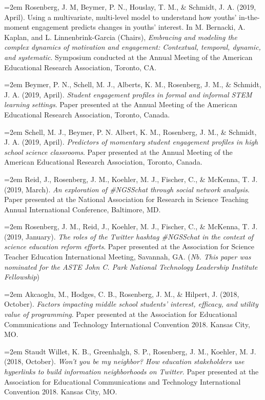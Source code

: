 \documentclass[
  14,
]{article}
\begin{document}
\hangindent=2em Rosenberg, J. M, Beymer, P. N., Houslay, T. M., \&
Schmidt, J. A. (2019, April). Using a multivariate, multi-level model to
understand how youths' in-the-moment engagement predicts changes in
youths' interest. In M. Bernacki, A. Kaplan, and L. Linnenbrink-Garcia
(Chairs), \emph{Embracing and modeling the complex dynamics of
motivation and engagement: Contextual, temporal, dynamic, and
systematic}. Symposium conducted at the Annual Meeting of the American
Educational Research Association, Toronto, CA.

\hangindent=2em Beymer, P. N., Schell, M. J., Alberts, K. M., Rosenberg,
J. M., \& Schmidt, J. A. (2019, April). \emph{Student engagement
profiles in formal and informal STEM learning settings}. Paper presented
at the Annual Meeting of the American Educational Research Association,
Toronto, Canada.

\hangindent=2em Schell, M. J., Beymer, P. N. Albert, K. M., Rosenberg,
J. M., \& Schmidt, J. A. (2019, April). \emph{Predictors of momentary
student engagement profiles in high school science classrooms}. Paper
presented at the Annual Meeting of the American Educational Research
Association, Toronto, Canada.

\hangindent=2em Reid, J., Rosenberg, J. M., Koehler, M. J., Fischer, C.,
\& McKenna, T. J. (2019, March). \emph{An exploration of \#NGSSchat
through social network analysis}. Paper presented at the National
Association for Research in Science Teaching Annual International
Conference, Baltimore, MD.

\hangindent=2em Rosenberg, J. M., Reid, J., Koehler, M. J., Fischer, C.,
\& McKenna, T. J. (2019, January). \emph{The roles of the Twitter
hashtag \#NGSSchat in the context of science education reform efforts}.
Paper presented at the Association for Science Teacher Education
International Meeting, Savannah, GA. (\emph{Nb. This paper was nominated
for the ASTE John C. Park National Technology Leadership Institute
Fellowship})

\hangindent=2em Akcaoglu, M., Hodges, C. B., Rosenberg, J. M., \&
Hilpert, J. (2018, October). \emph{Factors impacting middle school
students' interest, efficacy, and utility value of programming}. Paper
presented at the Association for Educational Communications and
Technology International Convention 2018. Kansas City, MO.

\hangindent=2em Staudt Willet, K. B., Greenhalgh, S. P., Rosenberg, J.
M., Koehler, M. J. (2018, October). \emph{Won't you be my neighbor? How
education stakeholders use hyperlinks to build information neighborhoods
on Twitter}. Paper presented at the Association for Educational
Communications and Technology International Convention 2018. Kansas
City, MO.
\end{document}
